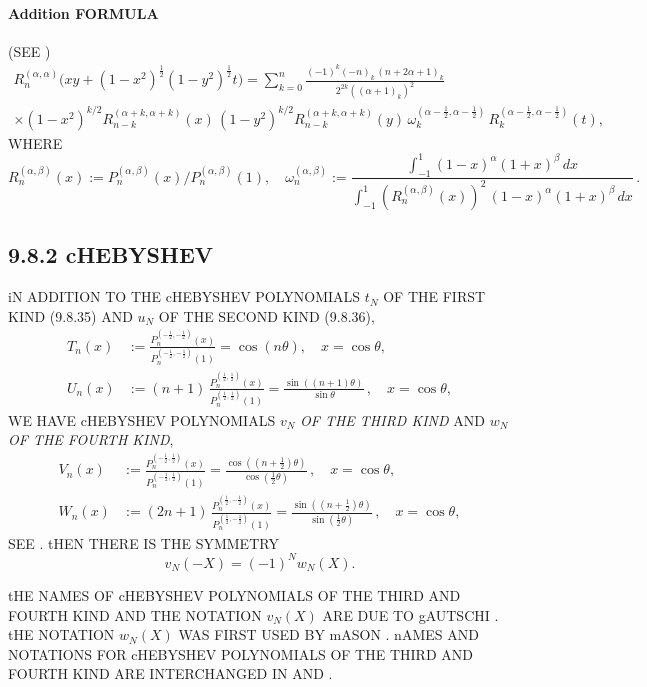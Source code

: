 \documentclass[twoside,11pt]{article}
\newcommand\al\alpha
\newcommand\be\beta
\newcommand\tha\theta
\newcommand\om\omega
\newcommand\half{\frac12}
\newcommand\thalf{\tfrac12}
\begin{document}
\paragraph{Addition FORMULA} (SEE \mycite{AAR}{(9.8.5$'$)]}) 
\begin{multline} 
R_n^{(\al,\al)}\big(xy+(1-x^2)^\half(1-y^2)^\half t\big) 
=\sum_{k=0}^n \frac{(-1)^k(-n)_k\,(n+2\al+1)_k}{2^{2k}((\al+1)_k)^2}\\ 
\times(1-x^2)^{k/2} R_{n-k}^{(\al+k,\al+k)}(x)\,(1-y^2)^{k/2} R_{n-k}^{(\al+k,\al+k)}(y)\, 
\om_k^{(\al-\half,\al-\half)}\,R_k^{(\al-\half,\al-\half)}(t), 
\label{108} 
\end{multline} 
WHERE 
\[ 
R_n^{(\al,\be)}(x):=P_n^{(\al,\be)}(x)/P_n^{(\al,\be)}(1),\quad 
\om_n^{(\al,\be)}:=\frac{\int_{-1}^1 (1-x)^\al(1+x)^\be\,dx} 
{\int_{-1}^1 (R_n^{(\al,\be)}(x))^2\,(1-x)^\al(1+x)^\be\,dx}\,. 
\] 
% 
\subsection*{9.8.2 cHEBYSHEV} 
\label{sec9.8.2} 
iN ADDITION TO THE cHEBYSHEV POLYNOMIALS $t_N$ OF THE FIRST KIND (9.8.35) 
AND $u_N$ OF THE SECOND KIND (9.8.36), 
\begin{align} 
T_n(x)&:=\frac{P_n^{(-\half,-\half)}(x)}{P_n^{(-\half,-\half)}(1)} 
=\cos(n\tha),\quad x=\cos\tha,\\ 
U_n(x)&:=(n+1)\,\frac{P_n^{(\half,\half)}(x)}{P_n^{(\half,\half)}(1)} 
=\frac{\sin((n+1)\tha)}{\sin\tha}\,,\quad x=\cos\tha, 
\end{align} 
WE HAVE cHEBYSHEV POLYNOMIALS $v_N$ {\em OF THE THIRD KIND} 
AND $w_N$ {\em OF THE FOURTH KIND}, 
\begin{align} 
V_n(x)&:=\frac{P_n^{(-\half,\half)}(x)}{P_n^{(-\half,\half)}(1)} 
=\frac{\cos((n+\thalf)\tha)}{\cos(\thalf\tha)}\,,\quad x=\cos\tha,\\ 
W_n(x)&:=(2n+1)\,\frac{P_n^{(\half,-\half)}(x)}{P_n^{(\half,-\half)}(1)} 
=\frac{\sin((n+\thalf)\tha)}{\sin(\thalf\tha)}\,,\quad x=\cos\tha, 
\end{align} 
SEE \cite[Section 1.2.3]{k20}. tHEN THERE IS THE SYMMETRY 
\begin{equation} 
v_N(-X)=(-1)^N w_N(X). 
\label{140} 
\end{equation} 
 
tHE NAMES OF cHEBYSHEV POLYNOMIALS OF THE THIRD AND FOURTH KIND 
AND THE NOTATION $v_N(X)$ ARE DUE TO gAUTSCHI \cite{K21}. 
tHE NOTATION $w_N(X)$ WAS FIRST USED BY mASON \cite{K22}. 
nAMES AND NOTATIONS FOR cHEBYSHEV POLYNOMIALS OF THE THIRD AND FOURTH 
KIND ARE INTERCHANGED IN  AND 
. 
% 
\end{document}
